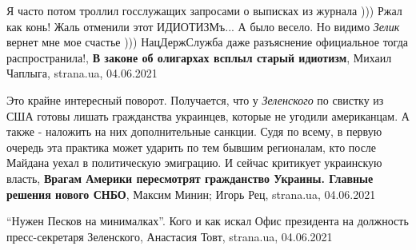 Я часто потом троллил госслужащих запросами о выписках из журнала ))) Ржал как
конь! Жаль отменили этот ИДИОТИЗМъ... А было весело. Но видимо \emph{Зелик}
вернет мне мое счастье ))) НацДержСлужба даже разъяснение официальное тогда
распространила!,
\textbf{В законе об олигархах всплыл старый идиотизм},
Михаил Чаплыга, strana.ua, 04.06.2021

Это крайне интересный поворот. Получается, что у \emph{Зеленского} по свистку
из США готовы лишать гражданства украинцев, которые не угодили американцам. А
также - наложить на них дополнительные санкции.  Судя по всему, в первую
очередь эта практика может ударить по тем бывшим регионалам, кто после Майдана
уехал в политическую эмиграцию. И сейчас критикует украинскую власть, 
\textbf{Врагам Америки пересмотрят гражданство Украины. Главные решения нового СНБО}, 
Максим Минин; Игорь Рец, strana.ua, 04.06.2021

\enquote{Нужен Песков на минималках}. Кого и как искал Офис президента на должность пресс-секретаря Зеленского,
Анастасия Товт, strana.ua, 04.06.2021


